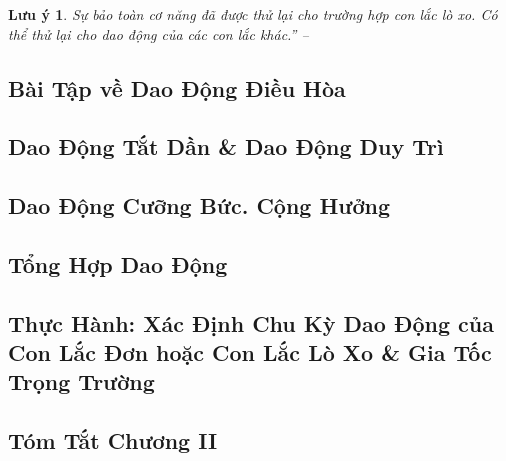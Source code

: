\documentclass{article}
\numberwithin{equation}{section}
\newtheorem{luuy}{Lưu ý}[section]
\begin{document}
\begin{luuy}
	Sự bảo toàn cơ năng đã được thử lại cho trường hợp con lắc lò xo. Có thể thử lại cho dao động của các con lắc khác.'' -- \cite[pp. 42--43]{SGK_Vat_Ly_12_nang_cao}
\end{luuy}


\subsection{Bài Tập về Dao Động Điều Hòa}


\subsection{Dao Động Tắt Dần \& Dao Động Duy Trì}


\subsection{Dao Động Cưỡng Bức. Cộng Hưởng}


\subsection{Tổng Hợp Dao Động}


\subsection{Thực Hành: Xác Định Chu Kỳ Dao Động của Con Lắc Đơn hoặc Con Lắc Lò Xo \& Gia Tốc Trọng Trường}


\subsection{Tóm Tắt Chương II}

\end{document}

